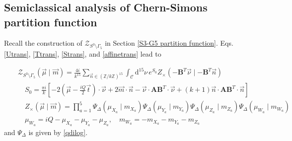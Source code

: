\documentclass[aps,prd,notitlepage,nofootinbib,superscriptaddress,groupedaddress,twocolumn]{revtex4-1}
\def\be{\begin{eqnarray}}
\def\ee{\end{eqnarray}}
\newcommand{\cz}{\mathcal Z}
\newcommand{\G}{\Gamma}
\newcommand{\lt}{\left}
\newcommand{\rt}{\right}
\begin{document}
\subsection{Semiclassical analysis of Chern-Simons partition function}\label{Semiclassical analysis of Chern-Simons partition function}


Recall the construction of $\cz_{S^3\setminus\G_5}$ in Section \ref{S3-G5 partition function}. Eqs.\eqref{Utrans}, \eqref{Ttrans}, \eqref{Strans}, and \eqref{affinetrans} lead to
\begin{widetext}
\be
&&\cz_{S^3\setminus\G_5}\left(\vec{\mu}\mid \vec{m}\right)%
=\frac{4i}{k^{15}} \sum_{\vec{n} \in(\mathbb{Z} / k \mathbb{Z})^{15}} \int_{\mathcal{C}} \mathrm{d}^{15} \nu\, e^{S_0}  Z_{\times}\left(-\mathbf{B}^{T} \vec{\nu} \mid-\mathbf{B}^{T} \vec{n}\right)\label{sumintZ}\\
&&\quad S_0=\frac{ \pi i}{k}\lt[-2\lt(\vec{\mu}-\frac{i Q}{2} \vec{t}\rt) \cdot \vec{\nu}+2\vec{m} \cdot \vec{n}-\vec{\nu} \cdot \mathbf{A B}^{T} \cdot \vec{\nu}+(k+1)\vec{n} \cdot \mathbf{A B}^{T} \cdot \vec{n}\right]\\
&&\quad Z_{\times}(\vec{\mu} \mid \vec{m})=\prod_{a=1}^{5} \Psi_{\Delta}\left(\mu_{X_a} \mid m_{X_a}\right) \Psi_{\Delta}\left(\mu_{Y_a} \mid m_{Y_a}\right) \Psi_{\Delta}\left(\mu_{Z_a} \mid m_{Z_a}\right) \Psi_{\Delta}\left(\mu_{W_a} \mid m_{W_a}\right)\\
&&\quad \mu_{W_a}=i Q-\mu_{X_a}-\mu_{Y_a}-\mu_{Z_a},\quad m_{W_a}=-m_{X_a}-m_{Y_a}-m_{Z_a}
\ee
and $\Psi_{\Delta}$ is given by \eqref{qdilog}. 


\end{widetext}
\end{document}
